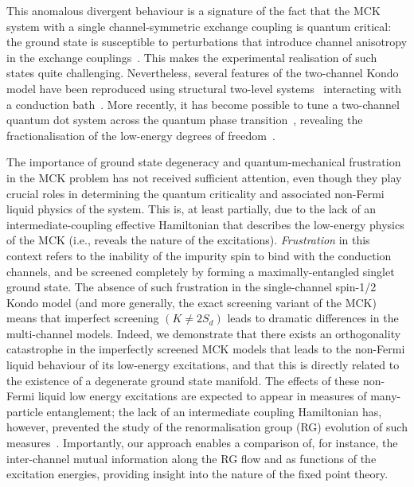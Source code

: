 \documentclass[reprint,prb,superscriptaddress]{revtex4-2}
\begin{document}
This anomalous divergent behaviour is a signature of the fact that the MCK system with a single channel-symmetric exchange coupling is quantum critical: the ground state is susceptible to perturbations that introduce channel anisotropy in the exchange couplings~\cite{Noz_blandin_1980,andrei_jerez_1995,affleck_pang_cox_1992,zarand_2000,zheng_2021}. This makes the experimental realisation of such states quite challenging.
Nevertheless, several features of the two-channel Kondo model have been reproduced using structural two-level systems~\cite{zawadowski_1980,vladar_1983} interacting with a conduction bath~\cite{cichorek_2005,ralph_buhrman_1992,ralph_ludwig_1994,Iftikhar2015,Zhu2016}.
More recently, it has become possible to tune a two-channel quantum dot system across the quantum phase transition~\cite{Potok2007,Keller2015}, revealing the fractionalisation of the low-energy degrees of freedom~\cite{emery1995,Coleman_tsvelik,mebrahtu_2013}.

The importance of ground state degeneracy and quantum-mechanical frustration in the MCK problem has not received sufficient attention, even though they play crucial roles in determining the quantum criticality and associated non-Fermi liquid physics of the system. This is, at least partially, due to the lack of an intermediate-coupling effective Hamiltonian that describes the low-energy physics of the MCK (i.e., reveals the nature of the excitations). \textit{Frustration} in this context refers to the inability of the impurity spin to bind with the conduction channels, and be screened completely by forming a maximally-entangled singlet ground state. The absence of such frustration in the single-channel spin-1/2 Kondo model (and more generally, the exact screening variant of the MCK) means that imperfect screening \((K \neq 2S_d)\) leads to dramatic differences in the multi-channel models. Indeed, we demonstrate that there exists an orthogonality catastrophe in the imperfectly screened MCK models that leads to the non-Fermi liquid behaviour of its low-energy excitations, and that this is directly related to the existence of a degenerate ground state manifold. The effects of these non-Fermi liquid low energy excitations are expected to appear in measures of many-particle entanglement; the lack of an intermediate coupling Hamiltonian has, however, prevented the study of the renormalisation group (RG) evolution of such measures~\cite{alkurtass_affleck_2016,kim_shim_2021}. 
Importantly, our approach enables a comparison of, for instance, the inter-channel mutual information along the RG flow and as functions of the excitation energies, providing insight into the nature of the fixed point theory.
\end{document}
